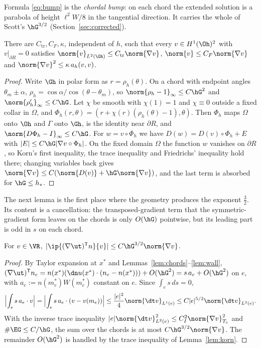 Formula \eqref{eq:bump} is the \emph{chordal bump}: on each chord the extended solution is a parabola of height $\ell^2W/8$ in the tangential direction. It carries the whole of Scott's $\hG^{3/2}$ (Section~\ref{sec:corrected}).

\begin{lemma}\label{lem:korn}
There are $C_{\mathrm{tr}},C_F,\kappa$, independent of $h$, such that every $v\in H^1(\Oh)^2$ with $v|_{\partial R}=0$ satisfies
$\norm{v}_{L^2(\Gh)}\le C_{\mathrm{tr}}\norm{\nabla v}$, $\norm{v}\le C_F\norm{\nabla v}$ and $\norm{\nabla v}^2\le\kappa\,a_h(v,v)$.
\end{lemma}

\begin{proof}
Write $\Gh$ in polar form as $r=\rho_h(\theta)$. On a chord with endpoint angles $\theta_m\pm\alpha$, $\rho_h=\cos\alpha/\cos(\theta-\theta_m)$, so $\norm{\rho_h-1}_\infty\le C\hG^2$ and $\norm{\rho_h'}_\infty\le C\hG$. Let $\chi$ be smooth with $\chi(1)=1$ and $\chi\equiv0$ outside a fixed collar in $\Omega$, and $\Phi_h(r,\theta)=(r+\chi(r)(\rho_h(\theta)-1),\theta)$. Then $\Phi_h$ maps $\Omega$ onto $\Oh$ and $\Gamma$ onto $\Gh$, is the identity near $\partial R$, and $\norm{D\Phi_h-I}_\infty\le C\hG$. For $w=v\circ\Phi_h$ we have $D(w)=D(v)\circ\Phi_h+E$ with $|E|\le C\hG|\nabla v\circ\Phi_h|$. On the fixed domain $\Omega$ the function $w$ vanishes on $\partial R$, so Korn's first inequality, the trace inequality and Friedrichs' inequality hold there; changing variables back gives $\norm{\nabla v}\le C(\norm{D(v)}+\hG\norm{\nabla v})$, and the last term is absorbed for $\hG\le h_\ast$.
\end{proof}

The next lemma is the first place where the geometry produces the exponent $\frac32$. Its content is a cancellation: the transposed-gradient term that the symmetric-gradient form leaves on the chords is only $O(\hG)$ pointwise, but its leading part is odd in $s$ on each chord.

\begin{lemma}\label{lem:transposed}
For $v\in\VR$, $|\ip{(\nabla\ut)^{\mathsf T}n}{v}|\le C\hG^{3/2}\norm{\nabla v}$.
\end{lemma}

\begin{proof}
By Taylor expansion at $x^\ast$ and Lemmas~\ref{lem:chords}--\ref{lem:wall}, $(\nabla\ut)^{\mathsf T}n_e=n(x^\ast)(\dn u(x^\ast)\cdot(n_e-n(x^\ast)))+O(\hG^2)=s\,a_e+O(\hG^2)$ on $e$, with $a_e:=n(m_e^\ast)W(m_e^\ast)$ constant on $e$. Since $\int_es\,ds=0$,
\[
\Bigl|\int_es\,a_e\cdot v\Bigr|=\Bigl|\int_es\,a_e\cdot(v-v(m_e))\Bigr|\le\frac{|e|^2}{4}\norm{\dt v}_{L^1(e)}\le C|e|^{5/2}\norm{\dt v}_{L^2(e)} .
\]
With the inverse trace inequality $|e|\norm{\dt v}_{L^2(e)}^2\le C_I^2\norm{\nabla v}^2_{T_e}$ and $\#\EG\le C/\hG$, the sum over the chords is at most $C\hG^{3/2}\norm{\nabla v}$. The remainder $O(\hG^2)$ is handled by the trace inequality of Lemma~\ref{lem:korn}.
\end{proof}

